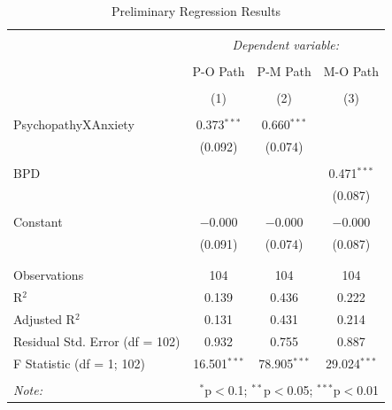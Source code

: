 \documentclass[
  man,floatsintext]{apa6}
\begin{document}
\begin{table}[!htbp] \centering 
  \caption{Preliminary Regression Results} 
  \label{} 
\begin{tabular}{@{\extracolsep{1pt}}lccc} 
\\[-1.8ex]\hline 
\hline \\[-1.8ex] 
 & \multicolumn{3}{c}{\textit{Dependent variable:}} \\ 
\cline{2-4} 
\\[-1.8ex] & P-O Path & P-M Path & M-O Path \\ 
\\[-1.8ex] & (1) & (2) & (3)\\ 
\hline \\[-1.8ex] 
 PsychopathyXAnxiety & 0.373$^{***}$ & 0.660$^{***}$ &  \\ 
  & (0.092) & (0.074) &  \\ 
  & & & \\ 
 BPD &  &  & 0.471$^{***}$ \\ 
  &  &  & (0.087) \\ 
  & & & \\ 
 Constant & $-$0.000 & $-$0.000 & $-$0.000 \\ 
  & (0.091) & (0.074) & (0.087) \\ 
  & & & \\ 
\hline \\[-1.8ex] 
Observations & 104 & 104 & 104 \\ 
R$^{2}$ & 0.139 & 0.436 & 0.222 \\ 
Adjusted R$^{2}$ & 0.131 & 0.431 & 0.214 \\ 
Residual Std. Error (df = 102) & 0.932 & 0.755 & 0.887 \\ 
F Statistic (df = 1; 102) & 16.501$^{***}$ & 78.905$^{***}$ & 29.024$^{***}$ \\ 
\hline 
\hline \\[-1.8ex] 
\textit{Note:}  & \multicolumn{3}{r}{$^{*}$p$<$0.1; $^{**}$p$<$0.05; $^{***}$p$<$0.01} \\ 
\end{tabular} 
\end{table}
\end{document}
